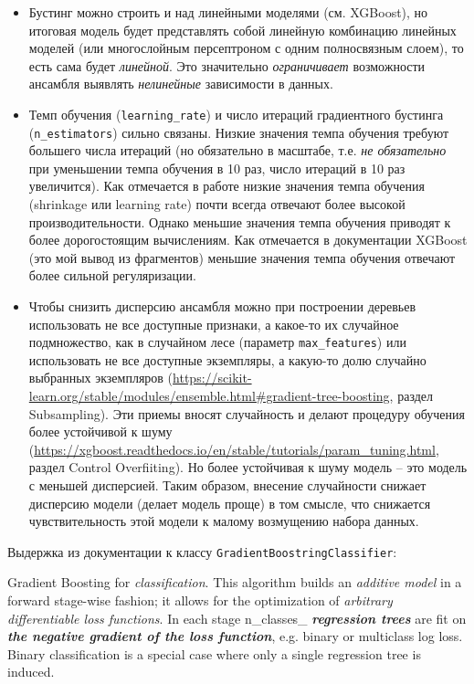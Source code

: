 \documentclass[%
	11pt,
	a4paper,
	utf8,
		]{article}
\begin{document}
\begin{itemize}
	\item Бустинг можно строить и над линейными моделями (см. XGBoost), но итоговая модель будет представлять собой линейную комбинацию линейных моделей (или многослойным персептроном с одним полносвязным слоем), то есть сама будет \emph{линейной}. Это значительно \emph{ограничивает} возможности ансамбля выявлять \emph{нелинейные} зависимости в данных.
	
	\item Темп обучения (\verb|learning_rate|) и число итераций градиентного бустинга (\verb|n_estimators|) сильно связаны. Низкие значения темпа обучения требуют большего числа итераций (но обязательно в масштабе, т.е. \emph{не обязательно} при уменьшении темпа обучения в 10 раз, число итераций в 10 раз увеличится). Как отмечается в работе низкие значения темпа обучения (shrinkage или learning rate) почти всегда отвечают более высокой производительности. Однако меньшие значения темпа обучения приводят к более дорогостоящим вычислениям. Как отмечается в документации XGBoost (это мой вывод из фрагментов) меньшие значения темпа обучения отвечают более сильной регуляризации.
	
	\item Чтобы снизить дисперсию ансамбля можно при построении деревьев использовать не все доступные признаки, а какое-то их случайное подмножество, как в случайном лесе (параметр \verb|max_features|) или использовать не все доступные экземпляры, а какую-то долю случайно выбранных экземпляров (\url{https://scikit-learn.org/stable/modules/ensemble.html#gradient-tree-boosting}, раздел Subsampling). Эти приемы вносят случайность и делают процедуру обучения более устойчивой к шуму (\url{https://xgboost.readthedocs.io/en/stable/tutorials/param_tuning.html}, раздел Control Overfiiting). Но более устойчивая к шуму модель -- это модель с меньшей дисперсией. Таким образом, внесение случайности снижает дисперсию модели (делает модель проще) в том смысле, что снижается чувствительность этой модели к малому возмущению набора данных.
\end{itemize}

\vspace*{3mm}
Выдержка из документации к классу \verb|GradientBoostringClassifier|:

Gradient Boosting for \emph{\color{blue}classification}. This algorithm builds an \emph{additive model} in a forward stage-wise fashion; it allows for the optimization of \emph{arbitrary differentiable loss functions}. In each stage n\_classes\_ \emph{\bfseries regression trees} are fit on \emph{\bfseries the negative gradient of the loss function}, e.g. binary or multiclass log loss. Binary classification is a special case where only a single regression tree is induced.
\end{document}
